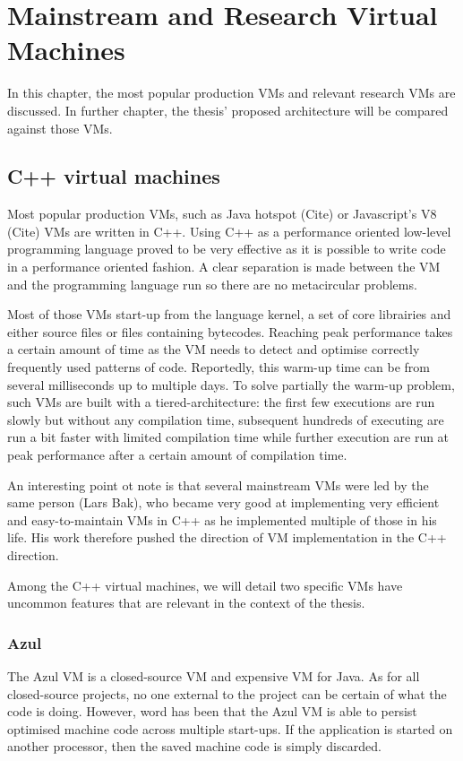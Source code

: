 \documentclass[a4paper,12pt,twoside]{../includes/ThesisStyle}
\begin{document}
\fi

\chapter{Mainstream and Research Virtual Machines}
\label{chap:stateOfTheArt}
\minitoc

In this chapter, the most popular production VMs and relevant research VMs are discussed. In further chapter, the thesis' proposed architecture will be compared against those VMs. 

\section{C++ virtual machines}

Most popular production VMs, such as Java hotspot (Cite) or Javascript's V8 (Cite) VMs are written in C++. Using C++ as a performance oriented low-level programming language proved to be very effective as it is possible to write code in a performance oriented fashion. A clear separation is made between the VM and the programming language run so there are no metacircular problems.

Most of those VMs start-up from the language kernel, a set of core librairies and either source files or files containing bytecodes. Reaching peak performance takes a certain amount of time as the VM needs to detect and optimise correctly frequently used patterns of code. Reportedly, this warm-up time can be from several milliseconds up to multiple days. To solve partially the warm-up problem, such VMs are built with a tiered-architecture: the first few executions are run slowly but without any compilation time, subsequent hundreds of executing are run a bit faster with limited compilation time while further execution are run at peak performance after a certain amount of compilation time.

An interesting point ot note is that several mainstream VMs were led by the same person (Lars Bak), who became very good at implementing very efficient and easy-to-maintain VMs in C++ as he implemented multiple of those in his life. His work therefore pushed the direction of VM implementation in the C++ direction.

Among the C++ virtual machines, we will detail two specific VMs have uncommon features that are relevant in the context of the thesis. 

\subsection{Azul}
The Azul VM \cite{Azul} is a closed-source VM and expensive VM for Java. As for all closed-source projects, no one external to the project can be certain of what the code is doing. However, word has been that the Azul VM is able to persist optimised machine code across multiple start-ups. If the application is started on another processor, then the saved machine code is simply discarded. 
\end{document}
